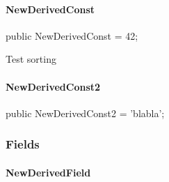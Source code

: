 \documentclass{report}
\begin{document}
\paragraph*{NewDerivedConst}\hspace*{\fill}

\begin{list}{}{
\setlength{\itemindent}{0cm}
\setlength{\listparindent}{0cm}
\setlength{\leftmargin}{\evensidemargin}
\addtolength{\leftmargin}{\tmplength}
\settowidth{\labelsep}{X}
\addtolength{\leftmargin}{\labelsep}
\setlength{\labelwidth}{\tmplength}
}
\begin{flushleft}
\item[\textbf{Declaration}\hfill]
\begin{ttfamily}
public NewDerivedConst = 42;\end{ttfamily}


\end{flushleft}
\par
\item[\textbf{Description}]
Test sorting

\end{list}
\paragraph*{NewDerivedConst2}\hspace*{\fill}

\begin{list}{}{
\setlength{\itemindent}{0cm}
\setlength{\listparindent}{0cm}
\setlength{\leftmargin}{\evensidemargin}
\addtolength{\leftmargin}{\tmplength}
\settowidth{\labelsep}{X}
\addtolength{\leftmargin}{\labelsep}
\setlength{\labelwidth}{\tmplength}
}
\begin{flushleft}
\item[\textbf{Declaration}\hfill]
\begin{ttfamily}
public NewDerivedConst2 = 'blabla';\end{ttfamily}


\end{flushleft}
\end{list}
\subsubsection*{\large{\textbf{Fields}}\normalsize\hspace{1ex}\hfill}
\paragraph*{NewDerivedField}\hspace*{\fill}
\end{document}
